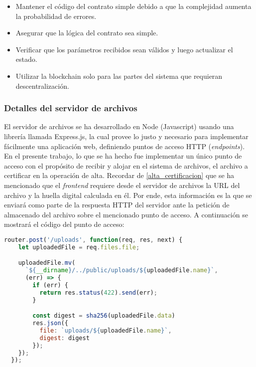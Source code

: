 \begin{itemize}
  \item Mantener el código del contrato simple debido a que la complejidad aumenta la probabilidad de errores.
  \item Asegurar que la lógica del contrato sea simple.
  \item Verificar que los parámetros recibidos sean válidos y luego actualizar el estado.
  \item Utilizar la blockchain solo para las partes del sistema que requieran descentralización.
\end{itemize}

\subsubsection{Detalles del servidor de archivos}
\label{detalles_servidor_archivos}

El servidor de archivos se ha desarrollado en Node (Javascript) usando una librería llamada Express.js, la cual provee lo justo y necesario para implementar fácilmente una aplicación web, definiendo puntos de acceso HTTP (\textit{endpoints})\cite{ExpressJS2018}.
En el presente trabajo, lo que se ha hecho fue implementar un único punto de acceso con el propósito de recibir y alojar en el sistema de archivos, el archivo a certificar en la operación de alta. Recordar de \ref{alta_certificacion} que se ha mencionado que el \textit{frontend} requiere desde el servidor de archivos la URL del archivo y la huella digital calculada en él. Por ende, esta información es la que se enviará como parte de la respuesta HTTP del servidor ante la petición de almacenado del archivo sobre el mencionado punto de acceso.
A continuación se mostrará el código del punto de acceso:

\begin{minipage}{\linewidth}
\begin{lstlisting}[frame=single, belowskip=1em, aboveskip=2em,  language=javascript, captionpos=b, caption=Punto de acceso para almacenar archivo, label={lst:post_archivo}]
  router.post('/uploads', function(req, res, next) {
    let uploadedFile = req.files.file;

    uploadedFile.mv(
      `${__dirname}/../public/uploads/${uploadedFile.name}`,
      (err) => {
        if (err) {
          return res.status(422).send(err);
        }

        const digest = sha256(uploadedFile.data)
        res.json({
          file: `uploads/${uploadedFile.name}`,
          digest: digest
        });
    });
  });
\end{lstlisting}
\end{minipage}

